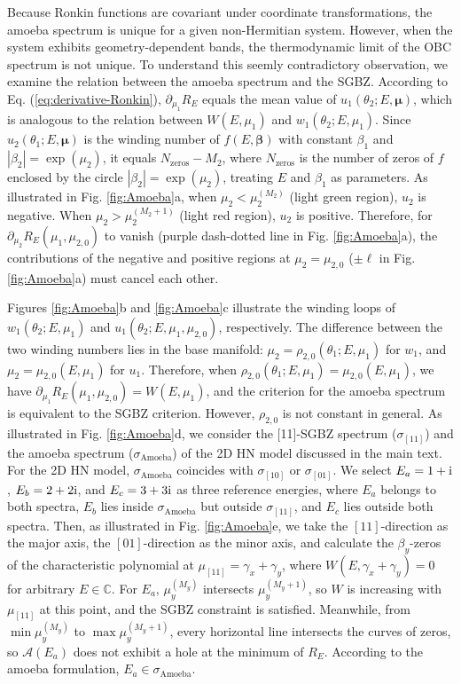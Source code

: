 \documentclass[pdflatex,sn-nature, iicol]{sn-jnl}%
\theoremstyle{thmstyleone}%
\theoremstyle{thmstyletwo}%
\theoremstyle{thmstylethree}%
\begin{document}
Because Ronkin functions are covariant under coordinate transformations,
the amoeba spectrum is unique for a given non-Hermitian system. However,
when the system exhibits geometry-dependent bands, the thermodynamic
limit of the OBC spectrum is not unique. To understand this seemly
contradictory observation, we examine the relation between the amoeba
spectrum and the SGBZ. According to Eq. (\ref{eq:derivative-Ronkin}),
$\partial_{\mu_{1}}R_{E}$ equals the mean value of $u_{1}(\theta_{2};E,\boldsymbol{\mu})$,
which is analogous to the relation between $W(E,\mu_{1})$ and $w_{1}(\theta_{2};E,\mu_{1})$.
Since $u_{2}(\theta_{1};E,\boldsymbol{\mu})$ is the winding number
of $f(E,\boldsymbol{\beta})$ with constant $\beta_{1}$ and $|\beta_{2}|=\exp(\mu_{2})$,
it equals $N_{\text{zeros}}-M_{2}$, where $N_{\text{zeros}}$ is
the number of zeros of $f$ enclosed by the circle $|\beta_{2}|=\exp(\mu_{2})$,
treating $E$ and $\beta_{1}$ as parameters. As illustrated in Fig.
\ref{fig:Amoeba}a, when $\mu_{2}<\mu_{2}^{(M_{2})}$ (light green
region), $u_{2}$ is negative. When $\mu_{2}>\mu_{2}^{(M_{2}+1)}$
(light red region), $u_{2}$ is positive. Therefore, for $\partial_{\mu_{2}}R_{E}(\mu_{1},\mu_{2,0})$
to vanish (purple dash-dotted line in Fig. \ref{fig:Amoeba}a), the
contributions of the negative and positive regions at $\mu_{2}=\mu_{2,0}$
($\pm\ell$ in Fig. \ref{fig:Amoeba}a) must cancel each other.

Figures \ref{fig:Amoeba}b and \ref{fig:Amoeba}c illustrate the winding
loops of $w_{1}(\theta_{2};E,\mu_{1})$ and $u_{1}(\theta_{2};E,\mu_{1},\mu_{2,0})$,
respectively. The difference between the two winding numbers lies
in the base manifold: $\mu_{2}=\rho_{2,0}(\theta_{1};E,\mu_{1})$
for $w_{1}$, and $\mu_{2}=\mu_{2,0}(E,\mu_{1})$ for $u_{1}$. Therefore,
when $\rho_{2,0}(\theta_{1};E,\mu_{1})=\mu_{2,0}(E,\mu_{1})$, we
have $\partial_{\mu_{1}}R_{E}(\mu_{1},\mu_{2,0})=W(E,\mu_{1})$, and
the criterion for the amoeba spectrum is equivalent to the SGBZ criterion.
However, $\rho_{2,0}$ is not constant in general. As illustrated
in Fig. \ref{fig:Amoeba}d, we consider the {[}11{]}-SGBZ spectrum
($\sigma_{[11]}$) and the amoeba spectrum ($\sigma_{\text{Amoeba}}$)
of the 2D HN model discussed in the main text. For the 2D HN model,
$\sigma_{\text{Amoeba}}$ coincides with $\sigma_{[10]}$ or $\sigma_{[01]}$.
We select $E_{a}=1+\mathrm{i}$, $E_{b}=2+2\mathrm{i}$, and $E_{c}=3+3\mathrm{i}$
as three reference energies, where $E_{a}$ belongs to both spectra,
$E_{b}$ lies inside $\sigma_{\text{Amoeba}}$ but outside $\sigma_{[11]}$,
and $E_{c}$ lies outside both spectra. Then, as illustrated in Fig.
\ref{fig:Amoeba}e, we take the $[11]$-direction as the major axis,
the $[01]$-direction as the minor axis, and calculate the $\beta_{y}$-zeros
of the characteristic polynomial at $\mu_{[11]}=\gamma_{x}+\gamma_{y}$,
where $W(E,\gamma_{x}+\gamma_{y})=0$ for arbitrary $E\in\mathbb{C}$.
For $E_{a}$, $\mu_{y}^{(M_{y})}$ intersects $\mu_{y}^{(M_{y}+1)}$,
so $W$ is increasing with $\mu_{[11]}$ at this point, and the SGBZ
constraint is satisfied. Meanwhile, from $\min\mu_{y}^{(M_{y})}$
to $\max\mu_{y}^{(M_{y}+1)}$, every horizontal line intersects the
curves of zeros, so $\mathcal{A}(E_{a})$ does not exhibit a hole
at the minimum of $R_{E}$. According to the amoeba formulation, $E_{a}\in\sigma_{\text{Amoeba}}$.
\end{document}
